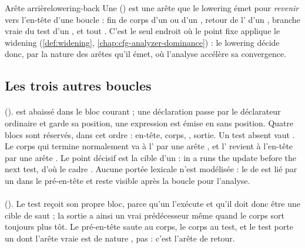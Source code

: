 \begin{definition}{Arête arrière}{lowering-back}
Une  () est une arête que le lowering émet pour \emph{revenir} vers l'en-tête d'une boucle : fin de corps d'un  ou d'un , retour de l' d'un , branche vraie du test d'un , et tout . C'est le seul endroit où le point fixe applique le widening (\cref{def:widening}, \cref{chap:cfg-analyzer-dominance}) : le lowering décide donc, par la nature des arêtes qu'il émet, où l'analyse accélère sa convergence.
\end{definition}

\subsection{Les trois autres boucles}

\paragraph{} ().  est abaissé dans le bloc courant ; une déclaration  passe par le déclarateur ordinaire et garde sa position, une expression est émise en  sans position. Quatre blocs sont réservés, dans cet ordre : en-tête, corps, , sortie. Un test absent vaut . Le corps qui termine normalement va à l' par une arête , et l' revient à l'en-tête par une arête . Le point décisif est la cible d'un  : \og {} in a  runs the update before the next test\fg{}, d'où le cadre . Aucune portée lexicale n'est modélisée : le  de  est lié par un  dans le pré-en-tête et reste visible après la boucle pour l'analyse.

\paragraph{} (). Le test reçoit son propre bloc, parce qu'un  l'exécute et qu'il doit donc être une cible de saut ; la sortie a ainsi un vrai prédécesseur même quand le corps sort toujours plus tôt. Le pré-en-tête saute au corps, le corps au test, et le test porte un  dont l'arête \og vraie\fg{} est de nature , pas  : c'est l'arête de retour.

